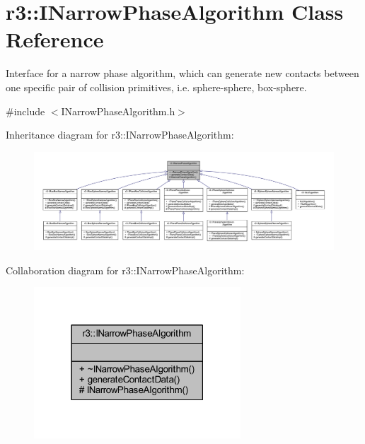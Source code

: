 \hypertarget{classr3_1_1_i_narrow_phase_algorithm}{}\section{r3\+:\+:I\+Narrow\+Phase\+Algorithm Class Reference}
\label{classr3_1_1_i_narrow_phase_algorithm}


Interface for a narrow phase algorithm, which can generate new contacts between one specific pair of collision primitives, i.\+e. sphere-\/sphere, box-\/sphere.  




{\ttfamily \#include $<$I\+Narrow\+Phase\+Algorithm.\+h$>$}



Inheritance diagram for r3\+:\+:I\+Narrow\+Phase\+Algorithm\+:\nopagebreak
\begin{figure}[H]
\begin{center}
\leavevmode
\includegraphics[width=350pt]{classr3_1_1_i_narrow_phase_algorithm__inherit__graph}
\end{center}
\end{figure}


Collaboration diagram for r3\+:\+:I\+Narrow\+Phase\+Algorithm\+:\nopagebreak
\begin{figure}[H]
\begin{center}
\leavevmode
\includegraphics[width=219pt]{classr3_1_1_i_narrow_phase_algorithm__coll__graph}
\end{center}
\end{figure}
